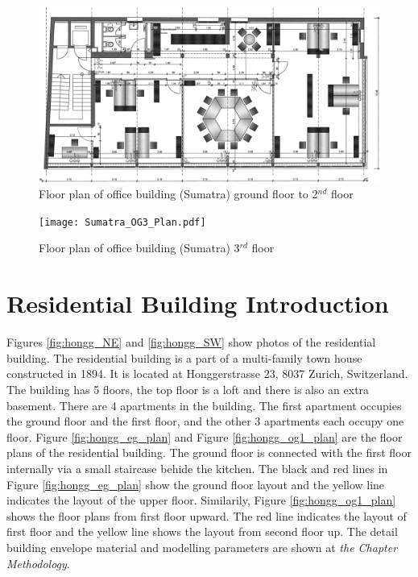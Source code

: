 \documentclass[a4paper, oneside]{discothesis}
\begin{document}
		\begin{figure}[ht!]
		  \centering
		  \includegraphics[scale=0.12]{Sumatra_OG2_Plan.pdf}
		  \caption{Floor plan of office building (Sumatra) ground floor to 2$^{nd}$ floor}
		  \label{fig:sumatra_og2}
		 \end{figure}

		\begin{figure}[ht!]
		  \centering
		  \texttt{[image: Sumatra\_OG3\_Plan.pdf]}
		  \caption{Floor plan of office building (Sumatra) 3$^{rd}$ floor}
		  \label{fig:sumatra_og3}
		\end{figure}
	
		
	\section{Residential Building Introduction}
		Figures \ref{fig:hongg_NE} and \ref{fig:hongg_SW} show photos of the residential building. The residential building is a part of a multi-family town house constructed in 1894. It is located at Honggerstrasse 23, 8037 Zurich, Switzerland. The building has 5 floors, the top floor is a loft and there is also an extra basement. There are 4 apartments in the building. The first apartment occupies the ground floor and the first floor, and the other 3 apartments each occupy one floor. Figure \ref{fig:hongg_eg_plan} and Figure \ref{fig:hongg_og1_plan} are the floor plans of the residential building. The ground floor is connected with the first floor internally via a small staircase behide the kitchen. The black and red lines in Figure \ref{fig:hongg_eg_plan} show the ground floor layout and the yellow line indicates the layout of the upper floor. Similarily, Figure \ref{fig:hongg_og1_plan} shows the floor plans from first floor upward. The  red line indicates the layout of first floor and the yellow line shows the layout from second floor up. The detail building envelope material and modelling parameters are shown at \textit{the Chapter Methodology}.\\
		
\end{document}
